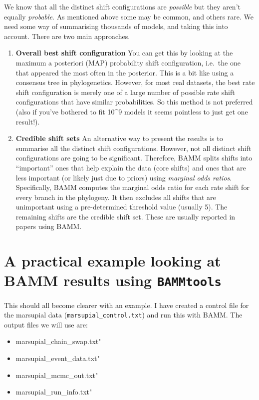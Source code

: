 \documentclass[]{book}
\providecommand{\tightlist}{%
  \setlength{\itemsep}{0pt}\setlength{\parskip}{0pt}}
\begin{document}
We know that all the distinct shift configurations are \emph{possible}
but they aren't equally \emph{probable}. As mentioned above some may be
common, and others rare. We need some way of summarising thousands of
models, and taking this into account. There are two main approaches.

\begin{enumerate}
\def\labelenumi{\arabic{enumi}.}
\item
  \textbf{Overall best shift configuration} You can get this by looking
  at the maximum a posteriori (MAP) probability shift configuration,
  i.e.~the one that appeared the most often in the posterior. This is a
  bit like using a consensus tree in phylogenetics. However, for most
  real datasets, the best rate shift configuration is merely one of a
  large number of possible rate shift configurations that have similar
  probabilities. So this method is not preferred (also if you've
  bothered to fit 10\^{}9 models it seems pointless to just get one
  result!).
\item
  \textbf{Credible shift sets} An alternative way to present the results
  is to summarise all the distinct shift configurations. However, not
  all distinct shift configurations are going to be significant.
  Therefore, BAMM splits shifts into ``important'' ones that help
  explain the data (core shifts) and ones that are less important (or
  likely just due to priors) using \emph{marginal odds ratios}.
  Specifically, BAMM computes the marginal odds ratio for each rate
  shift for every branch in the phylogeny. It then excludes all shifts
  that are unimportant using a pre-determined threshold value (usually
  5). The remaining shifts are the credible shift set. These are usually
  reported in papers using BAMM.
\end{enumerate}

\section{\texorpdfstring{A practical example looking at BAMM results
using
\texttt{BAMMtools}}{A practical example looking at BAMM results using BAMMtools}}\label{a-practical-example-looking-at-bamm-results-using-bammtools}

This should all become clearer with an example. I have created a control
file for the marsupial data (\texttt{marsupial\_control.txt}) and run
this with BAMM. The output files we will use are:

\begin{itemize}
\tightlist
\item
  marsupial\_chain\_swap.txt"\\
\item
  marsupial\_event\_data.txt"\\
\item
  marsupial\_mcmc\_out.txt"\\
\item
  marsupial\_run\_info.txt"
\end{itemize}
\end{document}
